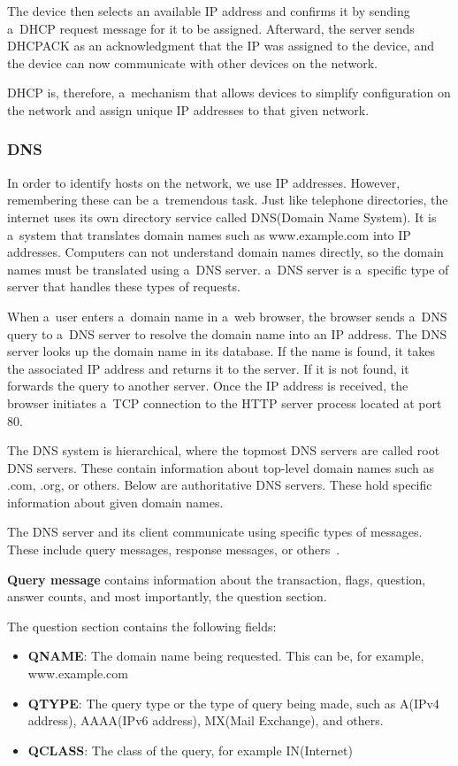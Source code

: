 \documentclass[
  printed,     %
  color,       %
  oneside,     %
  nosansbold,  %
  nocolorbold, %
  nolof,         %
  nolot,         %
]{fithesis4}
\begin{document}
The device then selects an available IP address and confirms it by sending a~DHCP request message for it to be assigned. Afterward, the server sends DHCPACK as an acknowledgment that the IP was assigned to the device, and the device can now communicate with other devices on the network.

DHCP is, therefore, a~mechanism that allows devices to simplify configuration on the network and assign unique IP addresses to that given network.

\subsubsection{DNS}
\label{sec:dns}
In order to identify hosts on the network, we use IP addresses. However, remembering these can be a~tremendous task. Just like telephone directories, the internet uses its own directory service called DNS(Domain Name System). It is a~system that translates domain names such as www.example.com into IP addresses. Computers can not understand domain names directly, so the domain names must be translated using a~DNS server. a~DNS server is a~specific type of server that handles these types of requests.

When a~user enters a~domain name in a~web browser, the browser sends a~DNS query to a~DNS server to resolve the domain name into an IP address. The DNS server looks up the domain name in its database. If the name is found, it takes the associated IP address and returns it to the server. If it is not found, it forwards the query to another server. Once the IP address is received, the browser initiates a~TCP connection to the HTTP server process located at port 80.

The DNS system is hierarchical, where the topmost DNS servers are called root DNS servers. These contain information about top-level domain names such as .com, .org, or others. Below are authoritative DNS servers. These hold specific information about given domain names.

The DNS server and its client communicate using specific types of messages. These include query messages, response messages, or others~\cite{10.5555/2584507}.

\textbf{Query message} contains information about the transaction, flags, question, answer counts, and most importantly, the question section.

The question section contains the following fields:

\begin{itemize}[noitemsep,topsep=0pt]
    \item \textbf{QNAME}: The domain name being requested. This can be, for example, www.example.com
    \item \textbf{QTYPE}: The query type or the type of query being made, such as A(IPv4 address), AAAA(IPv6 address), MX(Mail Exchange), and others.
    \item \textbf{QCLASS}: The class of the query, for example IN(Internet)
\end{itemize}
\end{document}
